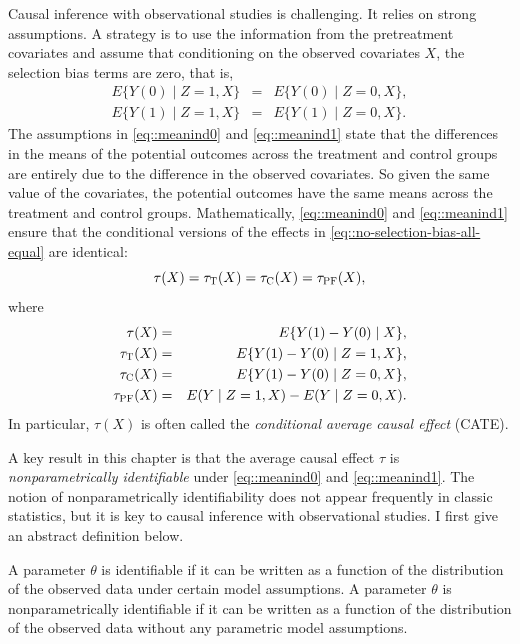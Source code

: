  
 Causal inference with observational studies is challenging. It relies on strong assumptions. A strategy is to use the information from the pretreatment covariates and assume that conditioning on the observed covariates $X$, the selection bias terms are zero, that is,
\begin{eqnarray}
\label{eq::meanind0} E\{   Y(0)  \mid Z = 1, X \} &=& E\{   Y(0)  \mid Z = 0, X \}  ,\\
\label{eq::meanind1} E\{   Y(1)  \mid Z = 1 , X\} &=& E\{   Y(1)  \mid Z = 0, X \}   . 
\end{eqnarray}
The assumptions in \eqref{eq::meanind0} and \eqref{eq::meanind1} state that the differences in the means of the potential outcomes across the treatment and control groups are entirely due to the difference in the observed covariates. So given the same value of the covariates, the potential outcomes have the same means across the treatment and control groups. Mathematically, \eqref{eq::meanind0} and \eqref{eq::meanind1} ensure that the conditional versions of the effects in \eqref{eq::no-selection-bias-all-equal} are identical: 
 $$
 \tau(X) = \tau_\textsc{T}(X) =  \tau_\textsc{C}(X) = \tau_\textsc{PF}(X),
 $$
 where
\begin{eqnarray*}
 \tau(X)  &=& E\{ Y(1) - Y(0) \mid X  \}, \\
 \tau_\textsc{T}(X) &=&  E\{ Y(1) - Y(0) \mid Z=1,  X  \},\\
  \tau_\textsc{C}(X) &=& E\{ Y(1) - Y(0) \mid Z=0,  X  \},\\
   \tau_\textsc{PF}(X) &=& E(Y\mid Z=1, X) - E(Y\mid Z=0, X).
\end{eqnarray*}
In particular, $ \tau(X) $ is often called the {\it conditional average causal effect} (CATE). 



A key result in this chapter is that the average causal effect $\tau$ is {\it nonparametrically identifiable} under \eqref{eq::meanind0} and \eqref{eq::meanind1}. The notion of nonparametrically identifiability does not appear frequently in classic statistics, but it is key to causal inference with observational studies. I first give an abstract definition below. 

\begin{definition}[identification]
\label{def::nonparametric-identification}
A parameter $\theta$ is identifiable if it can be written as a function of the distribution of the observed data under certain model assumptions. 
A parameter $\theta$ is nonparametrically identifiable if it can be written as a function of the distribution of the observed data without any parametric model assumptions. 
\end{definition}



